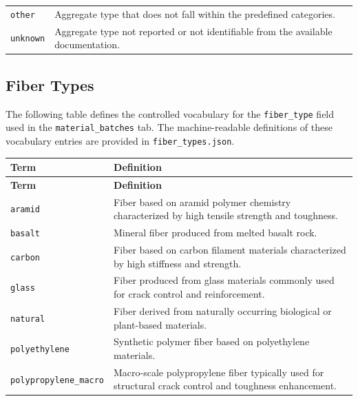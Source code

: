 \documentclass[11pt]{book}
\begin{document}
{\begin{longtable}{p{}p{}}
\texttt{other} &
Aggregate type that does not fall within the predefined categories. \\

\texttt{unknown} &
Aggregate type not reported or not identifiable from the available documentation. \\

\hline
\end{longtable}


\subsection{Fiber Types}
\label{vocab:fiber_type_list}

The following table defines the controlled vocabulary for the \texttt{fiber\_type} field used in the \texttt{material\_batches} tab. The machine-readable definitions of these vocabulary entries are provided in \texttt{fiber\_types.json}.

\begin{longtable}{p{}p{}}
\hline
\textbf{Term} & \textbf{Definition} \\
\hline
\endfirsthead

\hline
\textbf{Term} & \textbf{Definition} \\
\hline
\endhead

\texttt{aramid} &
Fiber based on aramid polymer chemistry characterized by high tensile strength and toughness. \\

\texttt{basalt} &
Mineral fiber produced from melted basalt rock. \\

\texttt{carbon} &
Fiber based on carbon filament materials characterized by high stiffness and strength. \\

\texttt{glass} &
Fiber produced from glass materials commonly used for crack control and reinforcement. \\

\texttt{natural} &
Fiber derived from naturally occurring biological or plant-based materials. \\

\texttt{polyethylene} &
Synthetic polymer fiber based on polyethylene materials. \\

\texttt{polypropylene\_macro} &
Macro-scale polypropylene fiber typically used for structural crack control and toughness enhancement. \\


\end{longtable}}
\end{document}

